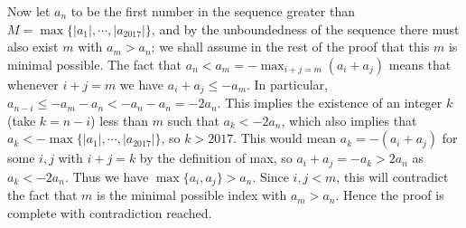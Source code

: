 \documentclass[11pt,a4paper]{article}
\begin{document}
\begin{enumerate}
	Now let $a_n$ to be the first number in the sequence greater than $M=\max\{|a_1|, \cdots , |a_{2017}|\}$, and by the unboundedness of the sequence there must also exist $m$ with $a_m>a_n$; we shall assume in the rest of the proof that this $m$ is minimal possible. The fact that $a_n<a_m=-\max_{i+j=m} (a_i+a_j)$ means that whenever $i+j=m$ we have $a_i+a_j\le -a_m$. In particular, $a_{n-i}\le -a_m-a_n<-a_n-a_n = -2a_n$. This implies the existence of an integer $k$ (take $k=n-i$) less than $m$ such that $a_{k}<-2a_n$, which also implies that $a_k<-\max\{|a_1|, \cdots , |a_{2017}|\}$, so $k>2017$. This would mean $a_k=-(a_i+a_j)$ for some $i, j$ with $i+j=k$ by the definition of max, so $a_i+a_j=-a_k>2a_n$ as $a_k<-2a_n$. Thus we have $\max\{a_i, a_j\}>a_n$. Since $i, j<m$, this will contradict the fact that $m$ is the minimal possible index with $a_m>a_n$. Hence the proof is complete with contradiction reached. 	
\end{enumerate}
\end{document}
